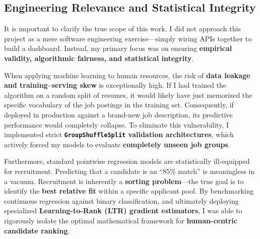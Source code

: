 \subsection{Engineering Relevance and Statistical Integrity}
\label{subsec:engineering_relevance}

It is important to clarify the true scope of this work. I did not approach this project as a mere software engineering exercise---simply wiring APIs together to build a dashboard. Instead, my primary focus was on ensuring \textbf{empirical validity, algorithmic fairness, and statistical integrity}.

When applying machine learning to human resources, the risk of \textbf{data leakage and training--serving skew} is exceptionally high. If I had trained the algorithm on a random split of resumes, it would likely have just memorized the specific vocabulary of the job postings in the training set. Consequently, if deployed in production against a brand-new job description, its predictive performance would completely collapse. To eliminate this vulnerability, I implemented strict \textbf{\texttt{GroupShuffleSplit} validation architectures}, which actively forced my models to evaluate \textbf{completely unseen job groups}.

Furthermore, standard pointwise regression models are statistically ill-equipped for recruitment. Predicting that a candidate is an ``85\% match'' is meaningless in a vacuum. Recruitment is inherently a \textbf{sorting problem}---the true goal is to identify the \textbf{best relative fit} within a specific applicant pool. By benchmarking continuous regression against binary classification, and ultimately deploying specialized \textbf{Learning-to-Rank (LTR) gradient estimators}, I was able to rigorously isolate the optimal mathematical framework for \textbf{human-centric candidate ranking}.